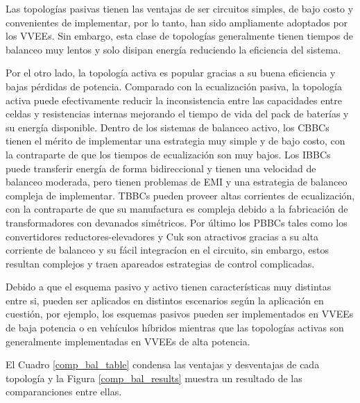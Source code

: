 \documentclass[10pt,a4paper]{article}
\begin{document}
Las topolog\'ias pasivas tienen las ventajas de ser circuitos simples, de bajo
costo y convenientes de implementar, por lo tanto, han sido ampliamente
adoptados por los \acrshort{VVEE}s. Sin embargo, esta clase de topolog\'ias
generalmente tienen tiempos de balanceo muy lentos y solo disipan energ\'ia
reduciendo la eficiencia del sistema.

Por el otro lado, la topolog\'ia activa es popular gracias a su buena eficiencia
y bajas p\'erdidas de potencia. Comparado con la ecualizaci\'on pasiva, la
topolog\'ia activa puede efectivamente reducir la inconsistencia entre las
capacidades entre celdas y resistencias internas mejorando el tiempo de vida del
pack de bater\'ias y su energ\'ia disponible.
\newpage
Dentro de los sistemas de balanceo activo, los \acrshort{CBBC}s tienen el
m\'erito de implementar una estrategia muy simple y de bajo costo, con la
contraparte de que los tiempos de ecualizaci\'on son muy bajos. Los
\acrshort{IBBC}s puede transferir energ\'ia de forma bidireccional y tienen una
velocidad de balanceo moderada, pero tienen problemas de \acrshort{EMI} y una
estrategia de balanceo compleja de implementar. \acrshort{TBBC}s pueden proveer
altas corrientes de ecualizaci\'on, con la contraparte de que su manufactura es
compleja debido a la fabricaci\'on de transformadores con devanados
sim\'etricos. Por \'ultimo los \acrshort{PBBC}s tales como los
convertidores reductores-elevadores y Cuk son atractivos gracias a su alta
corriente de balanceo y su f\'acil integrac\'ion en el circuito, sin embargo,
estos resultan complejos y traen apareados estrategias de control complicadas.

Debido a que el esquema pasivo y activo tienen caracter\'isticas muy distintas
entre si, pueden ser aplicados en distintos escenarios seg\'un la aplicaci\'on
en cuesti\'on, por ejemplo, los esquemas pasivos pueden ser implementados en
\acrshort{VVEE}s de baja potencia o en veh\'iculos h\'ibridos mientras que las
topolog\'ias activas son generalmente implementadas en \acrshort{VVEE}s de alta
potencia.

El Cuadro \ref{comp_bal_table} condensa las ventajas y desventajas de cada
topolog\'ia y la Figura \ref{comp_bal_results} muestra un resultado de las
comparanciones entre ellas. 
\end{document}
